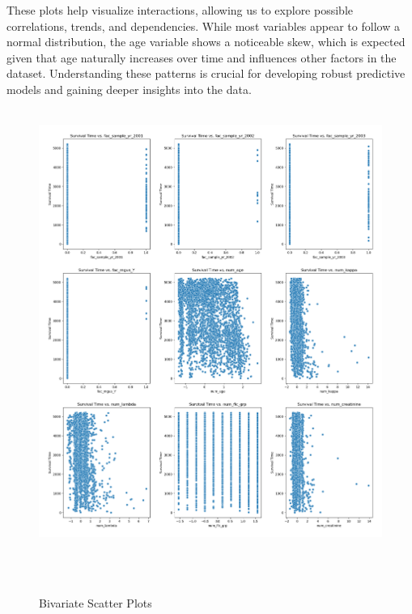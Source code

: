 \clearpage
\noindent These plots help visualize interactions, allowing us to explore possible correlations, trends, and dependencies. While most variables appear to follow a normal distribution, the age variable shows a noticeable skew, which is expected given that age naturally increases over time and influences other factors in the dataset. Understanding these patterns is crucial for developing robust predictive models and gaining deeper insights into the data.
\begin{figure}[h]
    \centering
    \includegraphics[scale=0.33]{Figures/EDA/scatter3.png}
    \caption{Bivariate Scatter Plots}
    \label{fig:scatter1}
\end{figure}

